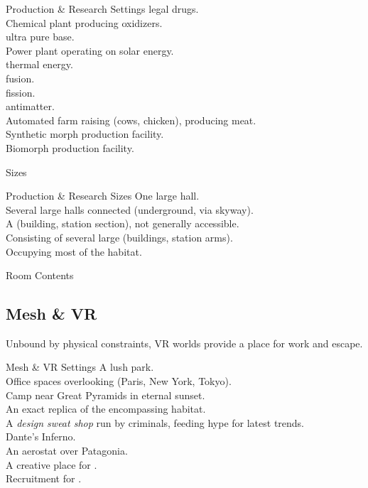 \begin{tableone}{Production \& Research Settings}
\textellipsis legal drugs.\\
Chemical plant producing oxidizers.\\
\textellipsis ultra pure  base.\\
Power plant operating on solar energy.\\
\textellipsis thermal energy.\\
\textellipsis fusion.\\
\textellipsis fission.\\
\textellipsis antimatter.\\
Automated farm raising (cows, chicken), producing meat.\\
Synthetic morph production facility.\\
Biomorph production facility.\\
\end{tableone}


Sizes

\begin{tableone}{Production \& Research Sizes}
One large hall.\\
Several large halls connected (underground, via skyway).\\
A (building, station section), not generally accessible.\\
Consisting of several large (buildings, station arms).\\
Occupying most of the habitat.\\
\end{tableone}



Room Contents

\starttableone
\stoptableone


\begin{multicols}{2}

\subsection*{Mesh \& VR}

Unbound by physical constraints, VR worlds provide a place for work and escape.

\end{multicols}

\begin{tableone}{Mesh \& VR Settings}
A lush park.\\
Office spaces overlooking (Paris, New York, Tokyo).\\
Camp near Great Pyramids in eternal sunset.\\
An exact replica of the encompassing habitat.\\
A \textit{design sweat shop} run by criminals, feeding hype for latest trends.\\
Dante's Inferno.\\
An aerostat over Patagonia.\\
A creative place for .\\
Recruitment for .\\
\end{tableone}


